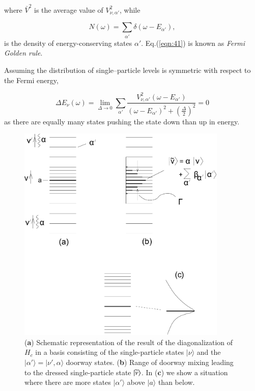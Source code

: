\noindent where $\bar{V}^2$ is the average value of $V_{\nu ,\alpha'}^2$, while

\begin{equation}
N(\omega) = \sum_{\alpha'} \delta(\omega - E_{\alpha'}) ,
\label{eqn:42}
\end{equation}
is the density of energy-conserving states $\alpha'$. Eq.(\ref{eqn:41}) is known as {\it Fermi Golden rule}.

Assuming the distribution of single--particle levels is symmetric with respect to the Fermi energy,

\begin{equation}
\Delta E_\nu(\omega) = \lim_{\Delta \rightarrow 0} \sum_{\alpha'} \frac{V_{\nu,\alpha'}^2 (\omega - E_{\alpha'})}{(\omega - E_{\alpha'})^2 + \left( \frac{\Delta}{2} \right)^2} = 0
\end{equation}
as there are equally many states pushing the state down than up in energy. 

\begin{figure}
\centerline {
\includegraphics*[width=10cm]{introduccion/figs/figintroD5}
}
\caption[Doorway states.]{(\textbf{a}) Schematic representation of the result of the diagonalization of $H_{c}$ in a basis consisting of the single-particle states $|\nu \rangle$ and the $|\alpha' \rangle=|\nu', {\alpha} \rangle$ doorway states. (\textbf{b}) Range of doorway mixing leading to the dressed single-particle state $|{\widetilde\nu} \rangle$. In (\textbf{c}) we show a situation where there are more states $|\alpha' \rangle$ above $|a\rangle$ than below.}
\label{fig:4.5}
\end{figure}




